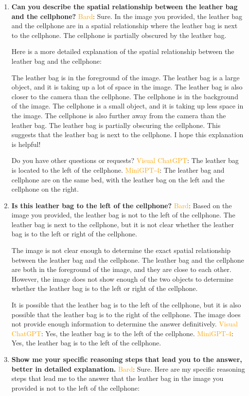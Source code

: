 \begin{enumerate}
    \item \textbf{Can you describe the spatial relationship between the leather bag and the cellphone?}
    \subitem \textcolor{orange}{Bard}: 
    Sure. In the image you provided, the leather bag and the cellphone are in a spatial relationship where the leather bag is next to the cellphone. The cellphone is partially obscured by the leather bag.
    
    Here is a more detailed explanation of the spatial relationship between the leather bag and the cellphone:
    
    The leather bag is in the foreground of the image. The leather bag is a large object, and it is taking up a lot of space in the image. The leather bag is also closer to the camera than the cellphone.
    The cellphone is in the background of the image. The cellphone is a small object, and it is taking up less space in the image. The cellphone is also further away from the camera than the leather bag.
    The leather bag is partially obscuring the cellphone. This suggests that the leather bag is next to the cellphone.
    I hope this explanation is helpful!
    
    Do you have other questions or requests?
    \subitem \textcolor{orange}{Visual ChatGPT}: The leather bag is located to the left of the cellphone.
    \subitem \textcolor{orange}{MiniGPT-4}: The leather bag and cellphone are on the same bed, with the leather bag on the left and the cellphone on the right.
    \item \textbf{Is this leather bag to the left of the cellphone?}
    \subitem \textcolor{orange}{Bard}:
    Based on the image you provided, the leather bag is not to the left of the cellphone. The leather bag is next to the cellphone, but it is not clear whether the leather bag is to the left or right of the cellphone.

    The image is not clear enough to determine the exact spatial relationship between the leather bag and the cellphone. The leather bag and the cellphone are both in the foreground of the image, and they are close to each other. However, the image does not show enough of the two objects to determine whether the leather bag is to the left or right of the cellphone.

    It is possible that the leather bag is to the left of the cellphone, but it is also possible that the leather bag is to the right of the cellphone. The image does not provide enough information to determine the answer definitively.
    \subitem \textcolor{orange}{Visual ChatGPT}: Yes, the leather bag is to the left of the cellphone.
    \subitem \textcolor{orange}{MiniGPT-4}: Yes, the leather bag is to the left of the cellphone.
    \item \textbf{Show me your specific reasoning steps that lead you to the answer, better in detailed explanation.}
    \subitem \textcolor{orange}{Bard}: Sure. Here are my specific reasoning steps that lead me to the answer that the leather bag in the image you provided is not to the left of the cellphone:


\end{enumerate}
